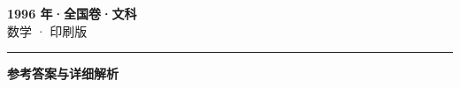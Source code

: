 \documentclass[zihao=5, a4paper]{ctexart}
\begin{document}
\begin{center}
  {\Large\bfseries 1996 年·全国卷·文科}\\[4pt]
  {\large 数学 · 印刷版}
\end{center}
\medskip
{}

\par\bigskip\hrule\bigskip
{}
\begin{center}{\large\bfseries 参考答案与详细解析}\end{center}
\smallskip

\end{document}
